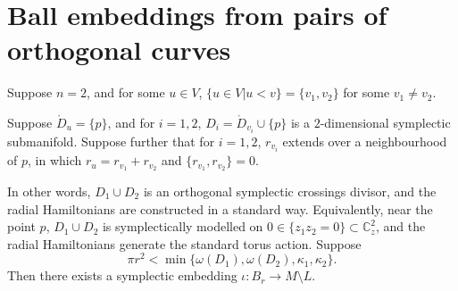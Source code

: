 \documentclass{article}
\numberwithin{equation}{section}
\numberwithin{figure}{section}
\begin{document}
\section{Ball embeddings from pairs of orthogonal curves}
\label{lower_bounds}
\begin{lem}
    Suppose $n=2$, and for some $u\in V$, $\{u\in V| u<v\}=\{v_1,v_2\}$ for some $v_1\neq v_2$.
    
    Suppose $\mathring{D}_{u}=\{p\}$, and for $i=1,2$, $D_i=\mathring{D}_{v_i}\cup \{p\}$ is a $2$-dimensional symplectic submanifold. Suppose further that for $i=1,2$, $r_{v_i}$ extends over a neighbourhood of $p$, in which $r_u=r_{v_1}+r_{v_2}$ and $\{r_{v_1},r_{v_2}\}=0$.

    In other words, $D_1\cup D_2$ is an orthogonal symplectic crossings divisor, and the radial Hamiltonians are constructed in a standard way. Equivalently, near the point $p$, $D_1\cup D_2$ is symplectically modelled on $0\in\{z_1z_2=0\}\subset \mathbb{C}_z^2$, and the radial Hamiltonians generate the standard torus action.    
    Suppose
    \begin{equation}
        \pi r^2<\min\{\omega(D_1),\omega(D_2),\kappa_1,\kappa_2\}.
    \end{equation}
    Then there exists a symplectic embedding $\iota:B_r\rightarrow M\setminus L$.
\end{lem}
\end{document}
